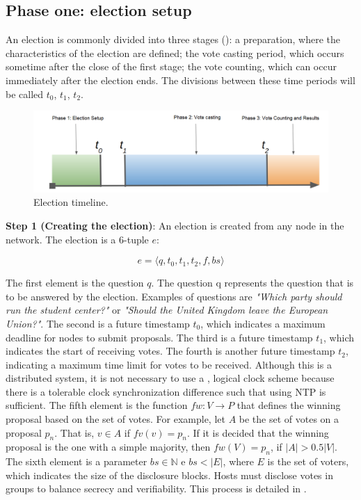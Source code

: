 \documentclass[english]{textolivre}
\begin{document}
\subsection{Phase one: election setup \label{sec-phase-one}}


An election is commonly divided into three stages (): a preparation, where the characteristics of the election are defined; the vote casting period, which occurs sometime after the close of the first stage; the vote counting, which can occur immediately after the election ends. The divisions between these time periods will be called $t_{0}$, $t_{1}$, $t_{2}$.

\begin{figure}[htb]
\centering
\begin{minipage}{.8\textwidth}
   \includegraphics[width=\textwidth]{imagens/fig-001.png}
   \caption{Election timeline.}\label{fig_grafico}
\end{minipage}
\end{figure}


\textbf{Step 1 (Creating the election)}: An election is created from any node in the network. The election is a 6-tuple $e$:

\[
 e=\langle q, t_{0}, t_{1}, t_{2}, f, bs \rangle
\]

The first element is the question $q$. The question q represents the question that is to be answered by the election. Examples of questions are \textit{"Which party should run the student center?"} or \textit{"Should the United Kingdom leave the European Union?"}. The second is a future timestamp $t_{0}$, which indicates a maximum deadline for nodes to submit proposals. The third is a future timestamp $t_{1}$, which indicates the start of receiving votes. The fourth is another future timestamp $t_{2}$, indicating a maximum time limit for votes to be received. Although this is a distributed system, it is not necessary to use a , logical clock scheme because there is a tolerable clock synchronization difference such that using NTP is sufficient. The fifth element is the function $fw:V\longrightarrow P$ that defines the winning proposal based on the set of votes. For example, let $A$ be the set of votes on a proposal $p_{n}$. That is, $v \in A$ if $fv(v) = p_{n}$. If it is decided that the winning proposal is the one with a simple majority, then $fw(V) = p_{n}$, if $|A| > 0.5|V|$. The sixth element is a parameter $bs \in \mathbb{N}$ e $bs < |E|$, where $E$ is the set of voters, which indicates the size of the disclosure blocks. Hosts must disclose votes in groups to balance secrecy and verifiability. This process is detailed in .
\end{document}
